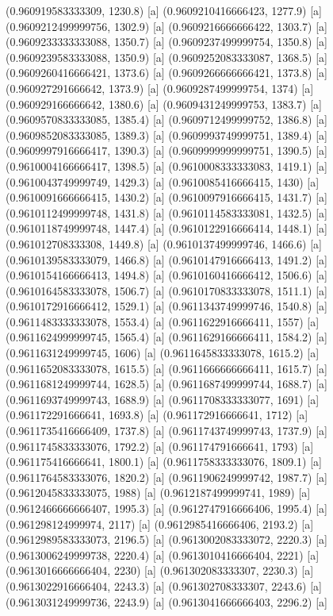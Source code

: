 {{{(0.960919583333309, 1230.8) [a] 
(0.9609210416666423, 1277.9) [a] 
(0.9609212499999756, 1302.9) [a] 
(0.9609216666666422, 1303.7) [a] 
(0.9609233333333088, 1350.7) [a] 
(0.9609237499999754, 1350.8) [a] 
(0.9609239583333088, 1350.9) [a] 
(0.9609252083333087, 1368.5) [a] 
(0.9609260416666421, 1373.6) [a] 
(0.9609266666666421, 1373.8) [a] 
(0.960927291666642, 1373.9) [a] 
(0.9609287499999754, 1374) [a] 
(0.960929166666642, 1380.6) [a] 
(0.9609431249999753, 1383.7) [a] 
(0.9609570833333085, 1385.4) [a] 
(0.9609712499999752, 1386.8) [a] 
(0.9609852083333085, 1389.3) [a] 
(0.9609993749999751, 1389.4) [a] 
(0.9609997916666417, 1390.3) [a] 
(0.9609999999999751, 1390.5) [a] 
(0.9610004166666417, 1398.5) [a] 
(0.9610008333333083, 1419.1) [a] 
(0.9610043749999749, 1429.3) [a] 
(0.9610085416666415, 1430) [a] 
(0.9610091666666415, 1430.2) [a] 
(0.9610097916666415, 1431.7) [a] 
(0.9610112499999748, 1431.8) [a] 
(0.9610114583333081, 1432.5) [a] 
(0.9610118749999748, 1447.4) [a] 
(0.9610122916666414, 1448.1) [a] 
(0.961012708333308, 1449.8) [a] 
(0.9610137499999746, 1466.6) [a] 
(0.9610139583333079, 1466.8) [a] 
(0.9610147916666413, 1491.2) [a] 
(0.9610154166666413, 1494.8) [a] 
(0.9610160416666412, 1506.6) [a] 
(0.9610164583333078, 1506.7) [a] 
(0.9610170833333078, 1511.1) [a] 
(0.9610172916666412, 1529.1) [a] 
(0.9611343749999746, 1540.8) [a] 
(0.9611483333333078, 1553.4) [a] 
(0.9611622916666411, 1557) [a] 
(0.9611624999999745, 1565.4) [a] 
(0.9611629166666411, 1584.2) [a] 
(0.9611631249999745, 1606) [a] 
(0.9611645833333078, 1615.2) [a] 
(0.9611652083333078, 1615.5) [a] 
(0.9611666666666411, 1615.7) [a] 
(0.9611681249999744, 1628.5) [a] 
(0.9611687499999744, 1688.7) [a] 
(0.9611693749999743, 1688.9) [a] 
(0.9611708333333077, 1691) [a] 
(0.961172291666641, 1693.8) [a] 
(0.961172916666641, 1712) [a] 
(0.9611735416666409, 1737.8) [a] 
(0.9611743749999743, 1737.9) [a] 
(0.9611745833333076, 1792.2) [a] 
(0.961174791666641, 1793) [a] 
(0.961175416666641, 1800.1) [a] 
(0.9611758333333076, 1809.1) [a] 
(0.9611764583333076, 1820.2) [a] 
(0.9611906249999742, 1987.7) [a] 
(0.9612045833333075, 1988) [a] 
(0.9612187499999741, 1989) [a] 
(0.9612466666666407, 1995.3) [a] 
(0.9612747916666406, 1995.4) [a] 
(0.961298124999974, 2117) [a] 
(0.9612985416666406, 2193.2) [a] 
(0.9612989583333073, 2196.5) [a] 
(0.9613002083333072, 2220.3) [a] 
(0.9613006249999738, 2220.4) [a] 
(0.9613010416666404, 2221) [a] 
(0.9613016666666404, 2230) [a] 
(0.961302083333307, 2230.3) [a] 
(0.9613022916666404, 2243.3) [a] 
(0.961302708333307, 2243.6) [a] 
(0.9613031249999736, 2243.9) [a] 
(0.9613041666666403, 2296.2) [a] 
}}}
